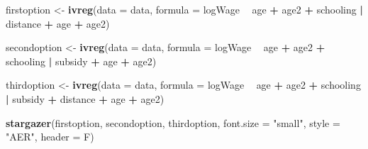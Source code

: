 \documentclass[
]{article}
\newenvironment{Shaded}{\begin{snugshade}}{\end{snugshade}}
\newcommand{\DataTypeTok}[1]{\textcolor[rgb]{0.13,0.29,0.53}{#1}}
\newcommand{\KeywordTok}[1]{\textcolor[rgb]{0.13,0.29,0.53}{\textbf{#1}}}
\newcommand{\NormalTok}[1]{#1}
\newcommand{\OperatorTok}[1]{\textcolor[rgb]{0.81,0.36,0.00}{\textbf{#1}}}
\newcommand{\StringTok}[1]{\textcolor[rgb]{0.31,0.60,0.02}{#1}}
\begin{document}
\begin{Shaded}
\begin{Highlighting}[]
\NormalTok{firstoption <-}\StringTok{ }\KeywordTok{ivreg}\NormalTok{(}\DataTypeTok{data =}\NormalTok{ data, }\DataTypeTok{formula =} 
\NormalTok{                         logWage }\OperatorTok{~}\StringTok{ }\NormalTok{age }\OperatorTok{+}\StringTok{ }\NormalTok{age2 }\OperatorTok{+}\StringTok{ }\NormalTok{schooling }\OperatorTok{|}\StringTok{ }\NormalTok{distance }\OperatorTok{+}\StringTok{ }\NormalTok{age }\OperatorTok{+}\StringTok{ }\NormalTok{age2)}

\NormalTok{secondoption <-}\StringTok{ }\KeywordTok{ivreg}\NormalTok{(}\DataTypeTok{data =}\NormalTok{ data, }\DataTypeTok{formula =}
\NormalTok{                          logWage }\OperatorTok{~}\StringTok{ }\NormalTok{age }\OperatorTok{+}\StringTok{ }\NormalTok{age2 }\OperatorTok{+}\StringTok{ }\NormalTok{schooling }\OperatorTok{|}\StringTok{ }\NormalTok{subsidy }\OperatorTok{+}\StringTok{ }\NormalTok{age }\OperatorTok{+}\StringTok{ }\NormalTok{age2)}

\NormalTok{thirdoption <-}\StringTok{ }\KeywordTok{ivreg}\NormalTok{(}\DataTypeTok{data =}\NormalTok{ data, }\DataTypeTok{formula =}
\NormalTok{                          logWage }\OperatorTok{~}\StringTok{ }\NormalTok{age }\OperatorTok{+}\StringTok{ }\NormalTok{age2 }\OperatorTok{+}\StringTok{ }\NormalTok{schooling }\OperatorTok{|}\StringTok{ }\NormalTok{subsidy }\OperatorTok{+}\StringTok{ }\NormalTok{distance }\OperatorTok{+}\StringTok{ }\NormalTok{age }
                     \OperatorTok{+}\StringTok{ }\NormalTok{age2)}
\end{Highlighting}
\end{Shaded}

\begin{Shaded}
\begin{Highlighting}[]
\KeywordTok{stargazer}\NormalTok{(firstoption, secondoption, thirdoption, }\DataTypeTok{font.size =} \StringTok{"small"}\NormalTok{, }
          \DataTypeTok{style =} \StringTok{"AER"}\NormalTok{, }
          \DataTypeTok{header =}\NormalTok{ F)}
\end{Highlighting}
\end{Shaded}
\end{document}

